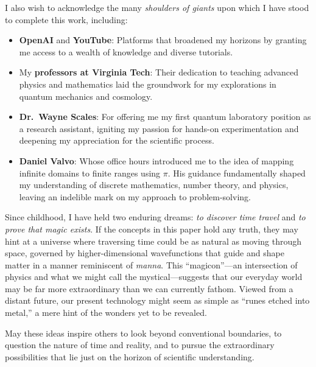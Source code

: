 \documentclass[11pt]{article}
\begin{document}
I also wish to acknowledge the many \emph{shoulders of giants} upon which 
I have stood to complete this work, including:
\begin{itemize}
  \item \textbf{OpenAI} and \textbf{YouTube}: Platforms that broadened my 
        horizons by granting me access to a wealth of knowledge and diverse 
        tutorials.
  \item My \textbf{professors at Virginia Tech}: Their dedication to teaching 
        advanced physics and mathematics laid the groundwork for my explorations 
        in quantum mechanics and cosmology.
  \item \textbf{Dr.\ Wayne Scales}: For offering me my first quantum laboratory 
        position as a research assistant, igniting my passion for hands-on 
        experimentation and deepening my appreciation for the scientific process.
  \item \textbf{Daniel Valvo}: Whose office hours introduced me to the idea of 
        mapping infinite domains to finite ranges using $\pi$. His guidance 
        fundamentally shaped my understanding of discrete mathematics, 
        number theory, and physics, leaving an indelible mark on my approach 
        to problem-solving.
\end{itemize}

Since childhood, I have held two enduring dreams: \textit{to discover time travel} 
and \textit{to prove that magic exists}. If the concepts in this paper hold any 
truth, they may hint at a universe where traversing time could be as natural as 
moving through space, governed by higher-dimensional wavefunctions that guide 
and shape matter in a manner reminiscent of \emph{manna}. This ``magicon''---an 
intersection of physics and what we might call the mystical---suggests that 
our everyday world may be far more extraordinary than we can currently fathom. 
Viewed from a distant future, our present technology might seem as simple as 
``runes etched into metal,'' a mere hint of the wonders yet to be revealed.

May these ideas inspire others to look beyond conventional boundaries, to 
question the nature of time and reality, and to pursue the extraordinary 
possibilities that lie just on the horizon of scientific understanding.


% 
% 

\end{document}
